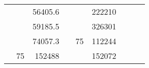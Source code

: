 \begin{table}[H]
\begin{tabular}{|ccrccrccc}
\multicolumn{1}{|c|}{\cellcolor[HTML]{FFFFC7}}                                & \multicolumn{1}{c|}{\cellcolor[HTML]{DAE8FC}}                      & \multicolumn{1}{r|}{\cellcolor[HTML]{DAE8FC}56405.6}   & \multicolumn{1}{c|}{\cellcolor[HTML]{FFFFC7}}                                & \multicolumn{1}{c|}{\cellcolor[HTML]{DAE8FC}}                       & \multicolumn{1}{r|}{\cellcolor[HTML]{DDFDFF}222210}    &                                                                              &                                                                    &                                                        \\ \cline{3-3} \cline{6-6}
\multicolumn{1}{|c|}{\cellcolor[HTML]{FFFFC7}}                                & \multicolumn{1}{c|}{\cellcolor[HTML]{DAE8FC}}                      & \multicolumn{1}{r|}{\cellcolor[HTML]{DDFDFF}59185.5}   & \multicolumn{1}{c|}{\cellcolor[HTML]{FFFFC7}}                                & \multicolumn{1}{c|}{\cellcolor[HTML]{DAE8FC}}                       & \multicolumn{1}{r|}{\cellcolor[HTML]{DAE8FC}326301}    &                                                                              &                                                                    &                                                        \\ \cline{3-3} \cline{6-6}
\multicolumn{1}{|c|}{\cellcolor[HTML]{FFFFC7}}                                & \multicolumn{1}{c|}{\cellcolor[HTML]{DAE8FC}}                      & \multicolumn{1}{r|}{\cellcolor[HTML]{DAE8FC}74057.3}   & \multicolumn{1}{c|}{\cellcolor[HTML]{FFFFC7}}                                & \multicolumn{1}{c|}{\multirow{-10}{*}{\cellcolor[HTML]{DAE8FC}75}}  & \multicolumn{1}{r|}{\cellcolor[HTML]{DDFDFF}112244}    &                                                                              &                                                                    &                                                        \\ \cline{3-3} \cline{5-6}
\multicolumn{1}{|c|}{\cellcolor[HTML]{FFFFC7}}                                & \multicolumn{1}{c|}{\multirow{-10}{*}{\cellcolor[HTML]{DAE8FC}75}} & \multicolumn{1}{r|}{\cellcolor[HTML]{DDFDFF}152488}    & \multicolumn{1}{c|}{\cellcolor[HTML]{FFFFC7}}                                & \multicolumn{1}{c|}{\cellcolor[HTML]{DDFDFF}}                       & \multicolumn{1}{r|}{\cellcolor[HTML]{DAE8FC}152072}    &                                                                              &                                                                    &                                                        \\ \cline{2-3} \cline{6-6}

\end{tabular}
\end{table}
